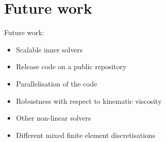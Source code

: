 \documentclass{beamer}
\newcommand{\re}[1]{{\textcolor{red}       {#1}}}
\begin{document}





\section{Future work}
\begin{frame}

Future work:
\begin{itemize}
\item Scalable inner solvers
\item Release code on a public repository
\item Parallelisation of the code
\item Robustness with respect to kinematic viscosity
\item Other non-linear solvers
\item Different mixed finite element discretisations
\end{itemize}
\end{frame}
\end{document}

